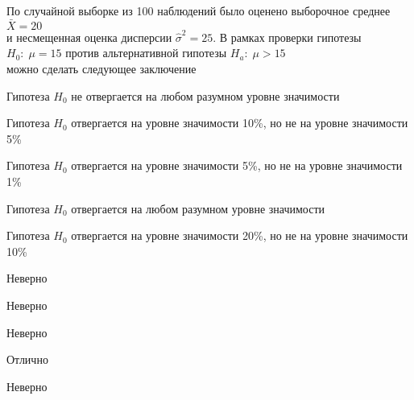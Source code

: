 
\begin{question}
По случайной выборке из 100 наблюдений было оценено выборочное среднее
\(\bar{X}=20\)\\
и несмещенная оценка дисперсии \(\hat{\sigma}^2=25\). В рамках проверки
гипотезы \(H_0: \; \mu=15\) против альтернативной гипотезы
\(H_a: \; \mu>15\)\\
можно сделать следующее заключение
\begin{answerlist}
  \item Гипотеза \(H_0\) не отвергается на любом разумном уровне значимости
  \item Гипотеза \(H_0\) отвергается на уровне значимости 10\%, но не на уровне
значимости 5\%
  \item Гипотеза \(H_0\) отвергается на уровне значимости 5\%, но не на уровне
значимости 1\%
  \item Гипотеза \(H_0\) отвергается на любом разумном уровне значимости
  \item Гипотеза \(H_0\) отвергается на уровне значимости 20\%, но не на уровне
значимости 10\%
\end{answerlist}
\end{question}

\begin{solution}
\begin{answerlist}
  \item Неверно
  \item Неверно
  \item Неверно
  \item Отлично
  \item Неверно
\end{answerlist}
\end{solution}

